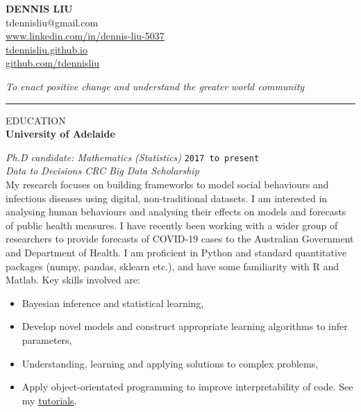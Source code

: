 \documentclass{article}
\newcommand{\HRule}{\rule{\linewidth}{0.5mm}}
\begin{document}
\begin{center} 

\textbf{\huge{DENNIS LIU}}
\\[0.5cm]

tdennisliu@gmail.com \\
\url{www.linkedin.com/in/dennis-liu-5037} \\
\url{tdennisliu.github.io}\\
\small{\url{github.com/tdennisliu}}

\end{center}
\emph{To enact positive change and understand the greater world community} 


\HRule

{\footnotesize EDUCATION}
\\

\textbf{\large University of Adelaide} 

\emph{Ph.D candidate: Mathematics (Statistics)} \hfill \texttt{2017 to present}\\[0.2cm]
\footnotesize{\emph{Data to Decisions CRC Big Data Scholarship}}\\

My research focuses on building frameworks to model social behaviours and infectious diseases using digital, non-traditional datasets. I am interested in analysing human behaviours and analysing their effects on models and forecasts of public health measures. I have recently been working with a wider group of researchers to provide forecasts of COVID-19 cases to the Australian Government and Department of Health. I am proficient in Python and standard quantitative packages (numpy, pandas, sklearn etc.), and have some familiarity with R and Matlab.
\hypersetup{urlcolor=black}
Key skills involved are:

\begin{itemize}
	\item Bayesian inference and statistical learning,
	\item Develop novel models and construct appropriate learning algorithms to infer parameters,
	\item Understanding, learning and applying solutions to complex problems,
	\item Apply object-orientated programming to improve interpretability of code. See my \href{https://tdennisliu.github.io/tutorials/1-simple-search-and-recursion.html#Towers-of_Hanoi}{tutorials}.
\end{itemize}
\end{document}
